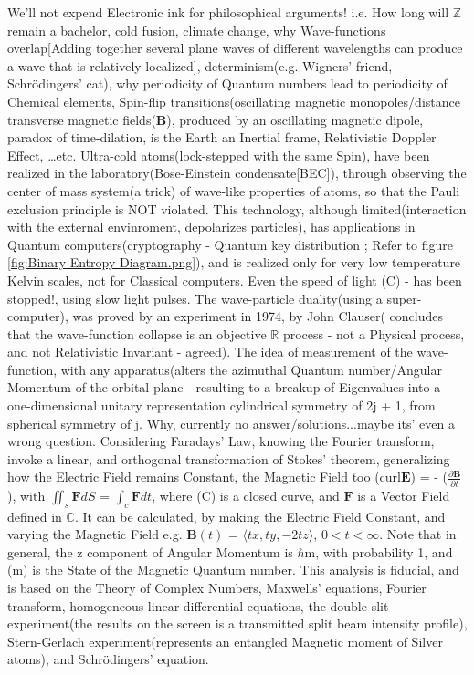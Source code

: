 \documentclass[a4paper, 10pt, onepage]{elegantbook}
\begin{document}
We'll not expend Electronic ink for philosophical arguments!
i.e. How long will $\mathbb Z$ remain a bachelor, cold fusion, climate change,
why Wave-functions overlap[Adding together several plane waves of different
wavelengths can produce a wave that is relatively localized], determinism(e.g.
Wigners' friend, Schr\"odingers' cat), why periodicity of Quantum numbers
lead to periodicity of Chemical elements, Spin-flip transitions(oscillating
magnetic monopoles/distance transverse magnetic fields($\mathbf B$), produced by
an oscillating magnetic dipole, paradox of time-dilation, is the Earth an
Inertial frame, Relativistic Doppler Effect, \ldots etc.
Ultra-cold atoms(lock-stepped with the same Spin), have been realized in the laboratory(Bose-Einstein condensate[BEC]), 
through observing the center of mass system(a trick) of wave-like properties of atoms, so that the Pauli exclusion 
principle is NOT violated.
This technology, although limited(interaction with the external envinroment, depolarizes particles), has applications 
in Quantum computers(cryptography - Quantum key distribution ; Refer to figure \ref{fig:Binary Entropy Diagram.png}), 
and is realized only for very low temperature Kelvin scales, not for Classical computers.
Even the speed of light (C) - has been stopped!, using slow light pulses. The wave-particle duality(using a 
super-computer), was proved by an experiment in 1974, by John Clauser( concludes that the wave-function collapse is an 
objective $\mathbb R$ process - not a Physical process, and not Relativistic Invariant - agreed). The idea of 
measurement of the wave-function, with any apparatus(alters the azimuthal Quantum number/Angular Momentum of the 
orbital plane - resulting to a breakup of Eigenvalues into a one-dimensional unitary representation cylindrical 
symmetry of 2j + 1, from spherical symmetry of j.
Why, currently no answer/solutions...maybe its' even a wrong question. Considering Faradays' Law, knowing the Fourier 
transform, invoke a linear, and orthogonal transformation of Stokes' theorem, generalizing how the Electric Field 
remains Constant, the Magnetic Field too (curl$\mathbf E$) = - ($\frac{\partial \mathbf B}{\partial t}$), with $\iint_s 
\mathbf F dS$ = $\int_c \mathbf F dt$, where (C) is a closed curve, and $\mathbf F$ is a Vector Field defined in 
$\mathbb C$. It can be calculated, by making the Electric Field Constant, and varying the Magnetic Field e.g.
$\mathbf B(t)$ = $\langle tx, ty, -2tz \rangle$, $0<t<\infty$. Note that in general, the z component of Angular 
Momentum is $\hbar$m, with probability 1, and (m) is the State of the Magnetic Quantum number.
This analysis is fiducial, and is based on the Theory of Complex Numbers, Maxwells' equations, Fourier transform, 
homogeneous linear differential equations, the double-slit experiment(the results on the screen is a transmitted split 
beam intensity profile), Stern-Gerlach experiment(represents an entangled Magnetic moment of Silver atoms), and 
Schr\"odingers' equation.
\end{document}

